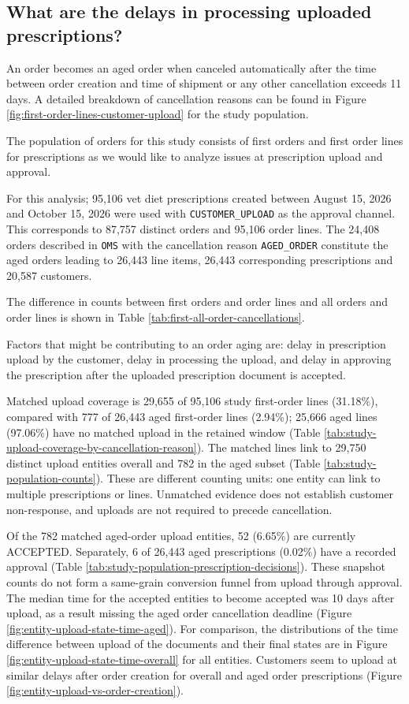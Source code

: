 \subsection{What are the delays in processing uploaded prescriptions?}
\label{app:aged-order-analysis}
An order becomes an aged order when canceled automatically after the
time between order creation and time of shipment or any other
cancellation exceeds 11 days. A detailed breakdown of cancellation
reasons can be found in Figure \ref{fig:first-order-lines-customer-upload}
for the study population.

The population of orders for this study consists of first orders and
first order lines for prescriptions as we would like to analyze issues at
prescription upload and approval.

For this analysis; 95,106 vet diet prescriptions created between
August 15, 2026 and October 15, 2026 were used with
\verb|CUSTOMER_UPLOAD| as the approval channel. This corresponds to
87,757 distinct orders and 95,106 order lines. The 24,408 orders
described in \verb|OMS| with the cancellation reason
\verb|AGED_ORDER| constitute the  aged orders leading to 26,443 line
items, 26,443 corresponding prescriptions and 20,587 customers.

The difference in counts between first orders and order lines and all
orders and order lines is shown in Table
\ref{tab:first-all-order-cancellations}.


Factors that might be contributing to an order aging are: delay in
prescription upload by the customer, delay in processing the upload,
and delay in approving the prescription after the uploaded
prescription document is accepted.

Matched upload coverage is 29,655 of 95,106 study first-order lines
(31.18\%), compared with 777 of 26,443 aged first-order lines (2.94\%);
25,666 aged lines (97.06\%) have no matched upload in the retained window
(Table \ref{tab:study-upload-coverage-by-cancellation-reason}).
The matched lines link to 29,750 distinct upload entities overall and
782 in the aged subset (Table \ref{tab:study-population-counts}).
These are different counting units: one entity can link to multiple
prescriptions or lines. Unmatched evidence does not establish customer
non-response, and uploads are not required to precede cancellation.

Of the 782 matched aged-order upload entities, 52 (6.65\%) are currently
ACCEPTED. Separately, 6 of 26,443 aged prescriptions (0.02\%) have a
recorded approval (Table \ref{tab:study-population-prescription-decisions}).
These snapshot counts do not form a same-grain conversion funnel from
upload through approval. The median time for the accepted entities
to become accepted was 10 days after upload, as a result
missing the aged order cancellation deadline (Figure
\ref{fig:entity-upload-state-time-aged}).  For comparison, the
distributions of the time difference between upload of the documents
and their final states are in Figure
\ref{fig:entity-upload-state-time-overall} for all entities.
Customers seem to upload at similar delays after order creation for
overall and aged order prescriptions (Figure
\ref{fig:entity-upload-vs-order-creation}).

